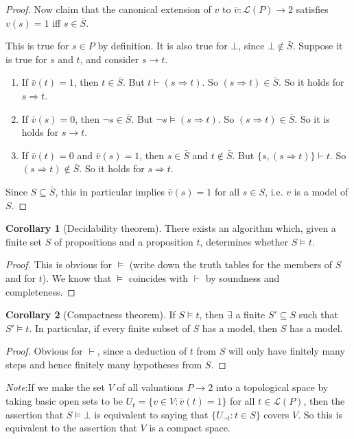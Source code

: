 \documentclass[a4paper]{article}
\theoremstyle{definition}
\newtheorem*{cor}{Corollary}
\newcommand{\note}{\noindent \emph{Note}:\;}
\newcommand{\La}{\mathcal{L}}
\begin{document}
\begin{proof}
Now claim that the canonical extension of $v$ to $\bar v: \La(P) \to 2$ satisfies $v(s)=1$ iff $s\in \bar S$.

This is true for $s\in P$ by definition. It is also true for $\bot$, since $\bot\not\in \bar S$.
Suppose it is true for $s$ and $t$, and consider $s\rightarrow t$.

\begin{enumerate}
\item If $\bar v(t) = 1$, then $t\in \bar S$. But $t\vdash (s\Rightarrow t)$. So $(s\Rightarrow t)\in \bar S$. So it holds for $s\Rightarrow t$.
\item If $\bar v(s) = 0$, then $\neg s\in \bar S$. But $\neg s\models (s\Rightarrow t)$. So $(s\Rightarrow t)\in \bar{S}$. So it is holds for $s\rightarrow t$.
\item If $\bar v(t) = 0$ and $\bar v(s) = 1$, then $s\in \bar S$ and $t\not\in \bar S$. But $\{s, (s\Rightarrow t)\}\vdash t$. So $(s\Rightarrow t)\not\in \bar S$. So it holds for $s\Rightarrow t$.
\end{enumerate}

Since $S\subseteq \bar S$, this in particular implies $\bar v(s) = 1$ for all $s\in S$, i.e. $v$ is a model of $S$.
\end{proof}

\begin{cor}[Decidability theorem]
  There exists an algorithm which, given a finite set $S$ of propositions and a proposition $t$, determines whether $S\models t$.
\end{cor}

\begin{proof}
  This is obvious for $\models$ (write down the truth tables for the members of $S$ and for $t$). We know that $\models$ coincides with $\vdash$ by soundness and completeness.
\end{proof}

\begin{cor}[Compactness theorem]
  If $S\models t$, then $\exists$ a finite $S'\subseteq S$ such that $S'\models t$. In particular, if every finite subset of $S$ has a model, then $S$ has a model. 
\end{cor}

\begin{proof}
  Obvious for $\vdash$, since a deduction of $t$ from $S$ will only have finitely many steps and hence finitely many hypotheses from $S$.
\end{proof}
\note If we make the set $V$ of all valuations $P\to 2$ into a topological space by taking basic open sets to be $U_t = \{v\in V: \bar v(t) = 1\}$ for all $t\in \La(P)$, then the assertion that $S\models \bot$ is equivalent to saying that $\{U_{\neg t} : t\in S\}$ covers $V$. So this is equivalent to the assertion that $V$ is a compact space. 
\end{document}

